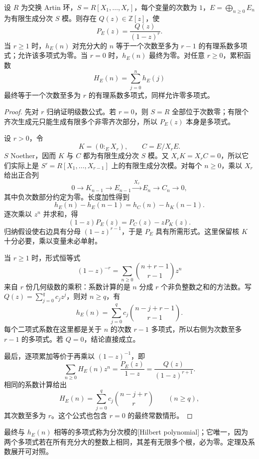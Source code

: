 \begin{theorem}\label{g5:thm:hilbert-serre}
	设 \(R\) 为交换 Artin 环，\(S=R[X_1,\ldots,X_r]\)，每个变量的次数为 \(1\)，\(E=\bigoplus_{n\geq0}E_n\) 为有限生成分次 \(S\) 模。则存在 \(Q(z)\in\mathbb Z[z]\)，使
	\[
		P_E(z)=\frac{Q(z)}{(1-z)^r}.
	\]
	当 \(r\geq1\) 时，\(h_E(n)\) 对充分大的 \(n\) 等于一个次数至多为 \(r-1\) 的有理系数多项式；允许该多项式为零。当 \(r=0\) 时，\(h_E(n)\) 最终为零。对任意 \(r\geq0\)，累积函数
	\[
		H_E(n)=\sum_{j=0}^n h_E(j)
	\]
	最终等于一个次数至多为 \(r\) 的有理系数多项式，同样允许零多项式。
\end{theorem}
\begin{proof}
	先对 \(r\) 归纳证明级数公式。若 \(r=0\)，则 \(S=R\) 全部位于次数零；有限个齐次生成元只能生成有限多个非零齐次部分，所以 \(P_E(z)\) 本身是多项式。

	设 \(r>0\)，令
	\[
		K=(0:_E X_r),\qquad C=E/X_rE.
	\]
	\(S\) Noether，因而 \(K\) 与 \(C\) 都为有限生成分次 \(S\) 模。又 \(X_rK=X_rC=0\)，所以它们实际上是
	\(S'=R[X_1,\ldots,X_{r-1}]\) 上的有限生成分次模。对每个 \(n\geq0\)，乘以 \(X_r\) 给出正合列
	\[
		0\longrightarrow K_{n-1}\longrightarrow E_{n-1}
		\xrightarrow{\,X_r\,}E_n\longrightarrow C_n\longrightarrow0,
	\]
	其中负次数部分约定为零。长度加性得到
	\[
		h_E(n)-h_E(n-1)=h_C(n)-h_K(n-1).
	\]
	逐次乘以 \(z^n\) 并求和，得
	\[
		(1-z)P_E(z)=P_C(z)-zP_K(z).
	\]
	归纳假设使右边具有分母 \((1-z)^{r-1}\)，于是 \(P_E\) 具有所需形式。这里保留核 \(K\) 十分必要，乘以变量未必单射。

	当 \(r\geq1\) 时，形式恒等式
	\[
		(1-z)^{-r}
		=\sum_{n\geq0}\binom{n+r-1}{r-1}z^n
	\]
	来自 \(r\) 份几何级数的乘积：系数计算的是 \(n\) 分成 \(r\) 个非负整数之和的方法数。写 \(Q(z)=\sum_{j=0}^q c_jz^j\)，则对 \(n\geq q\)，有
	\[
		h_E(n)=\sum_{j=0}^q c_j
		\binom{n-j+r-1}{r-1}.
	\]
	每个二项式系数在这里都是关于 \(n\) 的次数 \(r-1\) 多项式，所以右侧为次数至多 \(r-1\) 的多项式。若 \(Q=0\)，结论直接成立。

	最后，逐项累加等价于再乘以 \((1-z)^{-1}\)，即
	\[
		\sum_{n\geq0}H_E(n)z^n
		=\frac{P_E(z)}{1-z}
		=\frac{Q(z)}{(1-z)^{r+1}}.
	\]
	相同的系数计算给出
	\[
		H_E(n)=\sum_{j=0}^q c_j\binom{n-j+r}{r}
		\qquad(n\geq q),
	\]
	其次数至多为 \(r\)。这个公式也包含 \(r=0\) 的最终常数情形。
\end{proof}

最终与 \(h_E(n)\) 相等的多项式称为分次模的[Hilbert polynomial]；它唯一，因为两个多项式若在所有充分大的整数上相同，其差有无限多个根，必为零。定理及系数展开可对照\cite[第13节，定理13.2及其推论，第94--96页]{Matsumura1989}。

